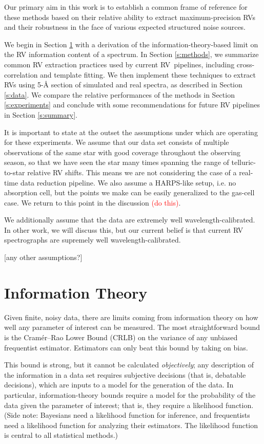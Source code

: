 \documentclass[modern]{aastex61}
\newcommand\todo[1]{\textcolor{red}{#1}}  %
\newcommand{\acronym}[1]{{\small{#1}}}
\newcommand{\RV}{\acronym{RV}}
\newcommand{\CRLB}{\acronym{CRLB}}
\begin{document}
Our primary aim in this work is to establish a common frame of reference for these methods based on their relative ability to extract maximum-precision RVs and their robustness in the face of various expected structured noise sources.

We begin in Section \ref{s:info} with a derivation of the information-theory-based limit on the RV information content of a spectrum. In Section \ref{s:methods}, we summarize common RV extraction practices used by current \RV\ pipelines, including cross-correlation and template fitting. We then implement these techniques to extract \RV s using 5-\r{A} section of simulated and real spectra, as described in Section \ref{s:data}. We compare the relative performances of the methods in Section \ref{s:experiments} and conclude with some recommendations for future RV pipelines in Section \ref{s:summary}. 

It is important to state at the outset the assumptions under which are operating for these experiments. We assume that our data set consists of multiple observations of the same star with good coverage throughout the observing season, so that we have seen the star many times spanning the range of telluric-to-star relative RV shifts. This means we are not considering the case of a real-time data reduction pipeline. We also assume a HARPS-like setup, i.e. no absorption cell, but the points we make can be easily generalized to the gas-cell case. We return to this point in the discussion \todo{(do this)}.

We additionally assume that the data are extremely well wavelength-calibrated. In other work, we will discuss this, but our current belief is that current RV spectrographs are supremely well wavelength-calibrated.

[any other assumptions?]

\section{Information Theory}
\label{s:info}

Given finite, noisy data, there are limits coming from information
theory on how well any parameter of interest can be measured.
The most straightforward bound is the Cram\'er--Rao Lower Bound (\CRLB) on the
variance of any unbiased frequentist estimator.
Estimators can only beat this bound by taking on bias.

This bound is strong, but it cannot be calculated \emph{objectively};
any description of the information in a data set requires
subjective decisions (that is, debatable decisions), which are inputs
to a model for the generation of the data.
In particular, information-theory bounds require a model for the
probability of the data given the parameter of interest; that is, they
require a likelihood function.
(Side note: Bayesians need a likelihood function for inference, and
frequentists need a likelihood function for analyzing their estimators.
The likelihood function is central to all statistical methods.)
\end{document}
